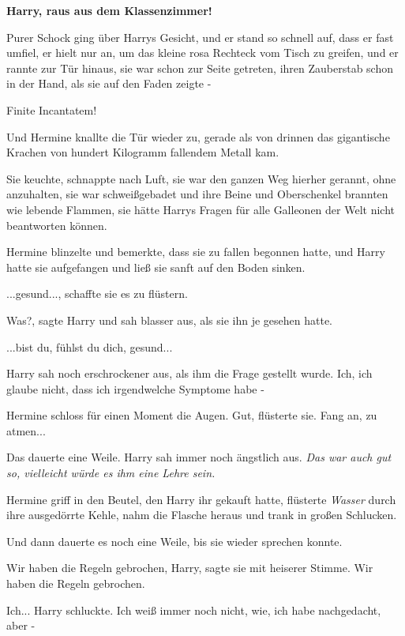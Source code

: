 \textbf{\glqq{}Harry, raus aus dem Klassenzimmer!\grqq{}}

Purer Schock ging über Harrys Gesicht, und er stand so schnell auf, dass er fast
umfiel, er hielt nur an, um das kleine rosa Rechteck vom Tisch zu greifen, und
er rannte zur Tür hinaus, sie war schon zur Seite getreten, ihren Zauberstab
schon in der Hand, als sie auf den Faden zeigte -

\glqq{}Finite Incantatem!\grqq{}

Und Hermine knallte die Tür wieder zu, gerade als von drinnen das gigantische
Krachen von hundert Kilogramm fallendem Metall kam.

Sie keuchte, schnappte nach Luft, sie war den ganzen Weg hierher gerannt, ohne
anzuhalten, sie war schweißgebadet und ihre Beine und Oberschenkel brannten wie
lebende Flammen, sie hätte Harrys Fragen für alle Galleonen der Welt nicht
beantworten können.

Hermine blinzelte und bemerkte, dass sie zu fallen begonnen hatte, und Harry
hatte sie aufgefangen und ließ sie sanft auf den Boden sinken.

\glqq{}...gesund...\grqq{}, schaffte sie es zu flüstern.

\glqq{}Was?\grqq{}, sagte Harry und sah blasser aus, als sie ihn je gesehen
hatte.

\glqq{}...bist du, fühlst du dich, gesund...\grqq{}

Harry sah noch erschrockener aus, als ihm die Frage gestellt wurde. \glqq{}Ich,
ich glaube nicht, dass ich irgendwelche Symptome habe -\grqq{}

Hermine schloss für einen Moment die Augen. \glqq{}Gut\grqq{}, flüsterte sie.
\glqq{}Fang an, zu atmen...\grqq{}

Das dauerte eine Weile. Harry sah immer noch ängstlich aus.
\emph{Das war auch gut so, vielleicht würde es ihm eine Lehre sein.}

Hermine griff in den Beutel, den Harry ihr gekauft hatte, flüsterte \glqq{}
\emph{Wasser}\grqq{} durch ihre ausgedörrte Kehle, nahm die Flasche heraus und
trank in großen Schlucken.

Und dann dauerte es noch eine Weile, bis sie wieder sprechen konnte.

\glqq{}Wir haben die Regeln gebrochen, Harry\grqq{}, sagte sie mit heiserer
Stimme. \glqq{}Wir haben die Regeln gebrochen.\grqq{}

\glqq{}Ich...\grqq{} Harry schluckte. \glqq{}Ich weiß immer noch nicht, wie, ich
habe nachgedacht, aber -\grqq{}

